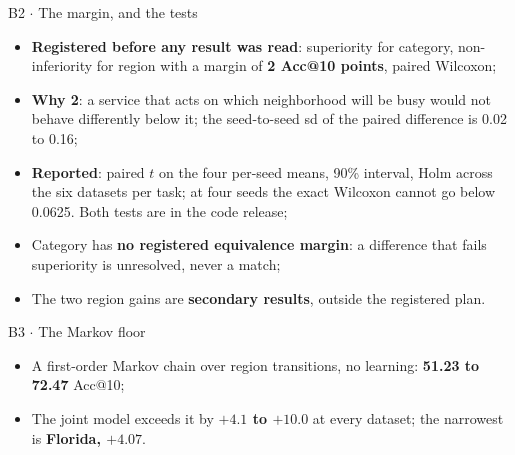 \documentclass{beamer}
\begin{document}
\begin{frame}{B2 $\cdot$ The margin, and the tests}
    \vspace{0pt}%
    \small
    \begin{itemize}\setlength{\itemsep}{1.4ex}
        \item \textbf{Registered before any result was read}: superiority for category,
              non-inferiority for region with a margin of \textbf{2 Acc@10 points}, paired Wilcoxon;
        \item \textbf{Why 2}: a service that acts on which neighborhood will be busy would not behave
              differently below it; the seed-to-seed sd of the paired difference is 0.02 to 0.16;
        \item \textbf{Reported}: paired $t$ on the four per-seed means, 90\% interval, Holm across
              the six datasets per task; at four seeds the exact Wilcoxon cannot go below 0.0625.
              Both tests are in the code release;
        \item Category has \textbf{no registered equivalence margin}: a difference that fails
              superiority is \alert{unresolved}, never a match;
        \item The two region gains are \textbf{secondary results}, outside the registered plan.
    \end{itemize}
\end{frame}

\begin{frame}{B3 $\cdot$ The Markov floor}
    \vspace{0pt}%
    \begin{itemize}\setlength{\itemsep}{2.2ex}
        \item A first-order Markov chain over region transitions, no learning:
              \textbf{51.23 to 72.47} Acc@10;
        \item The joint model exceeds it by \textbf{$+4.1$ to $+10.0$} at every dataset; the
              narrowest is \textbf{Florida, $+4.07$}.
    \end{itemize}
\end{frame}
\end{document}

